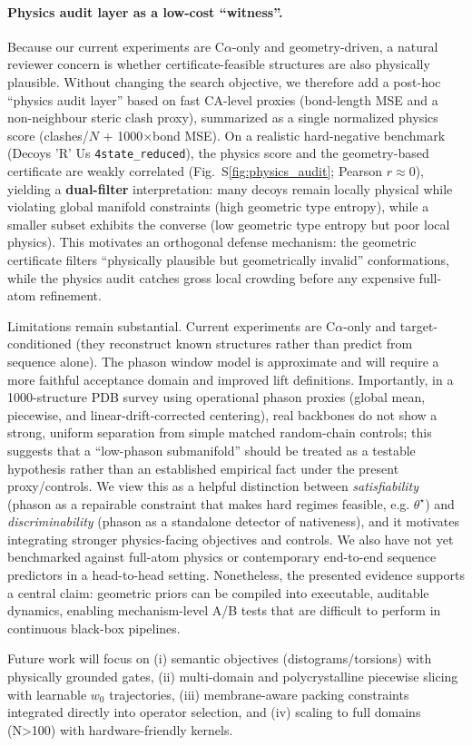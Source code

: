 \paragraph{Physics audit layer as a low-cost ``witness''.}
Because our current experiments are C$\alpha$-only and geometry-driven, a natural reviewer concern is whether certificate-feasible structures are also physically plausible. Without changing the search objective, we therefore add a post-hoc ``physics audit layer'' based on fast CA-level proxies (bond-length MSE and a non-neighbour steric clash proxy), summarized as a single normalized physics score (clashes/$N$ + 1000$\times$bond MSE). On a realistic hard-negative benchmark (Decoys 'R' Us \texttt{4state\_reduced}), the physics score and the geometry-based certificate are weakly correlated (Fig.~S\ref{fig:physics_audit}; Pearson $r\approx 0$), yielding a \textbf{dual-filter} interpretation: many decoys remain locally physical while violating global manifold constraints (high geometric type entropy), while a smaller subset exhibits the converse (low geometric type entropy but poor local physics). This motivates an orthogonal defense mechanism: the geometric certificate filters ``physically plausible but geometrically invalid'' conformations, while the physics audit catches gross local crowding before any expensive full-atom refinement.


Limitations remain substantial. Current experiments are C$\alpha$-only and target-conditioned (they reconstruct known structures rather than predict from sequence alone). The phason window model is approximate and will require a more faithful acceptance domain and improved lift definitions. Importantly, in a 1000-structure PDB survey using operational phason proxies (global mean, piecewise, and linear-drift-corrected centering), real backbones do not show a strong, uniform separation from simple matched random-chain controls; this suggests that a ``low-phason submanifold'' should be treated as a testable hypothesis rather than an established empirical fact under the present proxy/controls. We view this as a helpful distinction between \emph{satisfiability} (phason as a repairable constraint that makes hard regimes feasible, e.g. $\theta^\star$) and \emph{discriminability} (phason as a standalone detector of nativeness), and it motivates integrating stronger physics-facing objectives and controls. We also have not yet benchmarked against full-atom physics or contemporary end-to-end sequence predictors in a head-to-head setting. Nonetheless, the presented evidence supports a central claim: geometric priors can be compiled into executable, auditable dynamics, enabling mechanism-level A/B tests that are difficult to perform in continuous black-box pipelines.

Future work will focus on (i) semantic objectives (distograms/torsions) with physically grounded gates, (ii) multi-domain and polycrystalline piecewise slicing with learnable $w_0$ trajectories, (iii) membrane-aware packing constraints integrated directly into operator selection, and (iv) scaling to full domains (N>100) with hardware-friendly kernels.
